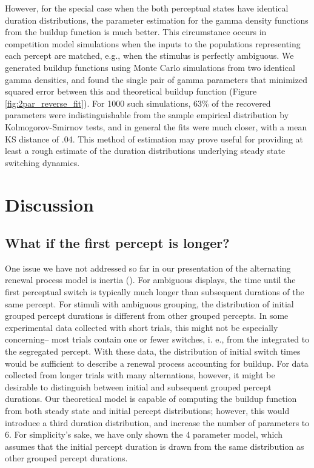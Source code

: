 However, for the special case when the both perceptual states have identical duration distributions, the parameter estimation for the gamma density functions from the buildup function is much better. This circumstance occurs in competition model simulations when the inputs to the populations representing each percept are matched, e.g., when the stimulus is perfectly ambiguous. We generated buildup functions using Monte Carlo simulations from two identical gamma densities, and found the single pair of gamma parameters that minimized squared error between this and theoretical buildup function (Figure \ref{fig:2par_reverse_fit}). For 1000 such simulations, 63\% of the recovered parameters were indistinguishable from the sample empirical distribution by Kolmogorov-Smirnov tests, and in general the fits were much closer, with a mean KS distance of .04. This method of estimation may prove useful for providing at least a rough estimate of the duration distributions underlying steady state switching dynamics.

\section{Discussion}
\subsection{What if the first percept is longer?}

One issue we have not addressed so far in our presentation of the alternating renewal process model is inertia (\cite{Hupe2012}). For ambiguous displays, the time until the first perceptual switch is typically much longer than subsequent durations of the same percept. For stimuli with ambiguous grouping, the distribution of initial grouped percept durations is different from other grouped percepts. In some experimental data collected with short trials, this might not be especially concerning-- most trials contain one or fewer switches, i. e., from the integrated to the segregated percept. With these data, the distribution of initial switch times would be sufficient to describe a renewal process accounting for buildup. For data collected from longer trials with many alternations, however, it might be desirable to distinguish between initial and subsequent grouped percept durations. Our theoretical model is capable of computing the buildup function from both steady state and initial percept distributions; however, this would introduce a third duration distribution, and increase the number of parameters to 6. For simplicity's sake, we have only shown the 4 parameter model, which assumes that the initial percept duration is drawn from the same distribution as other grouped percept durations.

